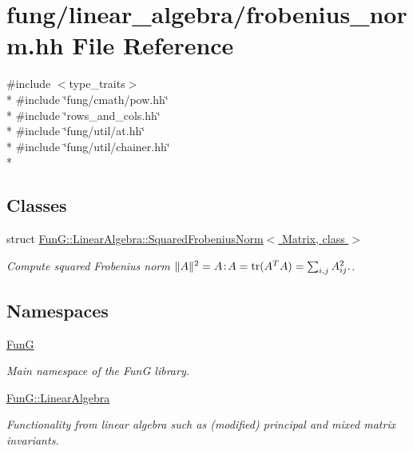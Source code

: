 \hypertarget{frobenius__norm_8hh}{}\section{fung/linear\+\_\+algebra/frobenius\+\_\+norm.hh File Reference}
\label{frobenius__norm_8hh}
{\ttfamily \#include $<$type\+\_\+traits$>$}\\*
{\ttfamily \#include \char`\"{}fung/cmath/pow.\+hh\char`\"{}}\\*
{\ttfamily \#include \char`\"{}rows\+\_\+and\+\_\+cols.\+hh\char`\"{}}\\*
{\ttfamily \#include \char`\"{}fung/util/at.\+hh\char`\"{}}\\*
{\ttfamily \#include \char`\"{}fung/util/chainer.\+hh\char`\"{}}\\*
\subsection*{Classes}
\begin{DoxyCompactItemize}
\item 
struct \hyperlink{structFunG_1_1LinearAlgebra_1_1SquaredFrobeniusNorm}{Fun\+G\+::\+Linear\+Algebra\+::\+Squared\+Frobenius\+Norm$<$ Matrix, class $>$}
\begin{DoxyCompactList}\small\item\em Compute squared Frobenius norm $ \|A\|^2 = A\negthinspace : \negthinspace A = \mathrm{tr}(A^TA) = \sum_{i,j} A_{ij}^2. $. \end{DoxyCompactList}\end{DoxyCompactItemize}
\subsection*{Namespaces}
\begin{DoxyCompactItemize}
\item 
 \hyperlink{namespaceFunG}{Fun\+G}
\begin{DoxyCompactList}\small\item\em Main namespace of the Fun\+G library. \end{DoxyCompactList}\item 
 \hyperlink{namespaceFunG_1_1LinearAlgebra}{Fun\+G\+::\+Linear\+Algebra}
\begin{DoxyCompactList}\small\item\em Functionality from linear algebra such as (modified) principal and mixed matrix invariants. \end{DoxyCompactList}\end{DoxyCompactItemize}
